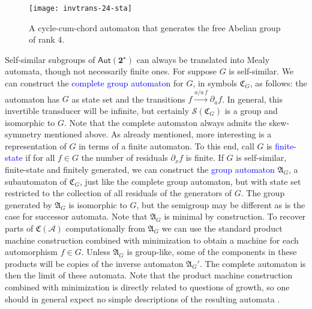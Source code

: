 \documentclass[12pt]{svmult}
\def\emph#1{\textcolor{blue}{#1}}
\def\2{\mathbf{2}}
\def\Aut{\mathsf{Aut}}
\def\SS{\Star{\2}}
\def\cA{\mathcal{A}}
\def\resid#1#2{\partial_{#1}{#2}}         %
\def\sgr{\mathcal{S}}                %
\def\trnp#1#2{{#1}{/}{#2}}
\def\cgraut#1{\fC_{#1}}         %
\def\cmpaut{\fC}                %
\def\fA{\mathfrak{A}}
\def\fC{\mathfrak{C}}           %
\def\graut#1{\fA_{#1}}          %
\providecommand{\Star}[1]{{#1}^{\star}}
\begin{document}
\begin{figure}[t]
  \centering
  \texttt{[image: invtrans-24-sta]}
  \caption{A cycle-cum-chord automaton that generates the free Abelian group of rank $4$.}
  \label{fig:ccc-6-4}
\end{figure}

Self-similar subgroups of $\Aut(\SS)$ can always be translated into Mealy automata, 
though not necessarily finite ones. 
For suppose $G$ is self-similar.  We can construct the \emph{complete group automaton}
for $G$, in symbols $\cgraut{G}$, as follows:  the automaton has $G$ as state set
and the transitions 
$f \xrightarrow{\trnp{a}{a \, f}} \resid{a}{f}$.
In general, this invertible transducer will be infinite, but certainly 
$\sgr(\cgraut{G})$ is a group and isomorphic to $G$. 
Note that the complete automaton always admits the skew-symmetry mentioned above.  
As already mentioned, more interesting is a representation of $G$ in terms 
of a finite automaton. To this end, call 
$G$ is \emph{finite-state} if for all $f \in G$ the number of residuals 
$\resid{x}{f}$ is finite. 
% 
If $G$ is self-similar, finite-state and finitely generated, we can construct 
the \emph{group automaton}  $\graut{G}$, a subautomaton of $\cgraut{G}$, just like the 
complete group automaton, but with state set restricted to the collection of all 
residuals of the generators of $G$. 
The group generated by $\graut{G}$ is isomorphic to $G$, but the semigroup may 
be different as is the case for successor automata.  
Note that $\graut{G}$ is minimal by construction. 
%
To recover parts of $\cmpaut(\cA)$ computationally from  $\graut{G}$ we can use 
the standard product machine construction combined with minimization to obtain 
a machine for each automorphism $f \in G$. 
Unless  $\graut{G}$ is group-like, some of the components in these products
will be copies of the inverse automaton $\graut{G}'$.
The complete automaton is then the limit of these automata. 
Note that the product machine construction combined with minimization is directly 
related to questions of growth, so one should in general expect no simple descriptions 
of the resulting automata \cite{BartholdiSilva10a:groups_automata}. 



\end{document}
